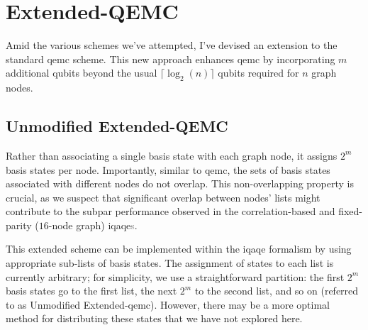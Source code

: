 










\section{Extended-QEMC}
\label{section:Extended_QEMC}


Amid the various schemes we've attempted, I've devised an extension to the standard \acrshort{qemc} scheme. This new approach enhances \acrshort{qemc} by incorporating $m$ additional qubits beyond the usual $\lceil\log_2(n)\rceil$ qubits required for $n$ graph nodes.

\subsection{Unmodified Extended-QEMC}
\label{subsection:Vanilla_Extended_QEMC}

Rather than associating a single basis state with each graph node, it assigns $2^m$ basis states per node. Importantly, similar to \acrshort{qemc}, the sets of basis states associated with different nodes do not overlap. This non-overlapping property is crucial, as we suspect that significant overlap between nodes' lists might contribute to the subpar performance observed in the correlation-based and fixed-parity ($16$-node graph) \acrshort{iqaqe}\textcolor{gray}{s}.

This extended scheme can be implemented within the \acrshort{iqaqe} formalism by using appropriate sub-lists of basis states. The assignment of states to each list is currently arbitrary; for simplicity, we use a straightforward partition: the first $2^m$ basis states go to the first list, the next $2^m$ to the second list, and so on (referred to as Unmodified Extended-\acrshort{qemc}). However, there may be a more optimal method for distributing these states that we have not explored here.

